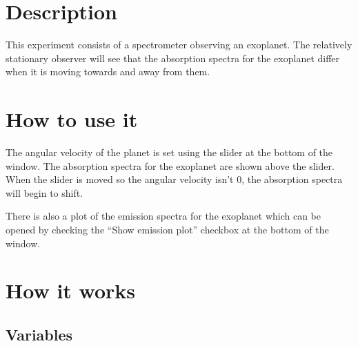 \section*{Description}
\label{sec-1}

This experiment consists of a spectrometer observing an exoplanet. The
relatively stationary observer will see that the absorption spectra
for the exoplanet differ when it is moving towards and away from them.
\section*{How to use it}
\label{sec-2}

The angular velocity of the planet is set using the slider at the
bottom of the window. The absorption spectra for the exoplanet
are shown above the slider. When the slider is moved so the angular
velocity isn't 0, the absorption spectra will begin to shift.

There is also a plot of the emission spectra for the exoplanet which
can be opened by checking the ``Show emission plot'' checkbox at the
bottom of the window.
\section*{How it works}
\label{sec-3}
\subsection*{Variables}
\label{sec-3-1}

